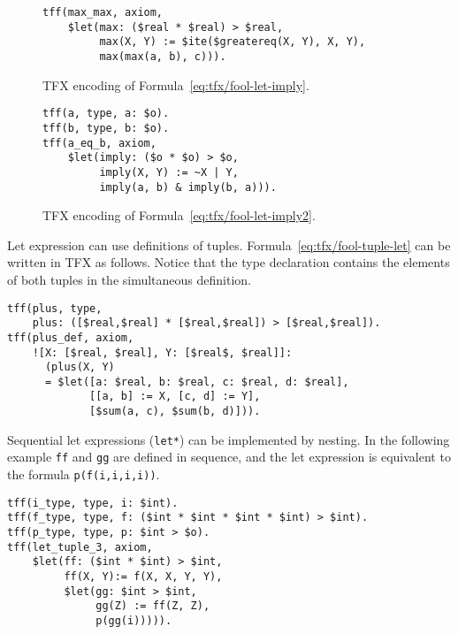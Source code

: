 \begin{figure}[htbp]
\begin{lstlisting}[language=tptp]
tff(max_max, axiom,
    $let(max: ($real * $real) > $real,
         max(X, Y) := $ite($greatereq(X, Y), X, Y),
         max(max(a, b), c))).
\end{lstlisting}
\caption{TFX encoding of Formula~\ref{eq:tfx/fool-let-imply}.}
\label{fig:tfx/let-tfx}
\end{figure}

\begin{figure}[htbp]
\begin{lstlisting}[language=tptp]
tff(a, type, a: $o).
tff(b, type, b: $o).
tff(a_eq_b, axiom,
    $let(imply: ($o * $o) > $o,
         imply(X, Y) := ~X | Y,
         imply(a, b) & imply(b, a))).
\end{lstlisting}
\caption{TFX encoding of Formula~\ref{eq:tfx/fool-let-imply2}.}
\label{fig:tfx/let-tfx2}
\end{figure}


Let expression can use definitions of tuples. 
Formula~\ref{eq:tfx/fool-tuple-let} can be written in TFX as follows. 
Notice that the type declaration contains the elements of both tuples in 
the simultaneous definition.
\begin{lstlisting}[language=tptp]
tff(plus, type,
    plus: ([$real,$real] * [$real,$real]) > [$real,$real]).
tff(plus_def, axiom,
    ![X: [$real, $real], Y: [$real$, $real]]:
      (plus(X, Y) 
      = $let([a: $real, b: $real, c: $real, d: $real],
             [[a, b] := X, [c, d] := Y],
             [$sum(a, c), $sum(b, d)])).
\end{lstlisting}

Sequential let expressions (\verb'let*') can be implemented by nesting. 
In the following example \lstinline'ff' and \lstinline'gg' are defined in sequence, and the let expression is equivalent to the formula \lstinline'p(f(i,i,i,i))'.
\begin{lstlisting}[language=tptp]
tff(i_type, type, i: $int).
tff(f_type, type, f: ($int * $int * $int * $int) > $int).
tff(p_type, type, p: $int > $o).
tff(let_tuple_3, axiom,
    $let(ff: ($int * $int) > $int,
         ff(X, Y):= f(X, X, Y, Y),
         $let(gg: $int > $int,
              gg(Z) := ff(Z, Z),
              p(gg(i))))).
\end{lstlisting}

